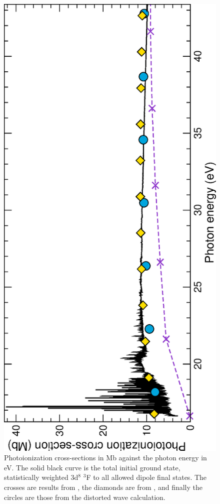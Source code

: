 %
\begin{figure}
\centering
\includegraphics[scale=0.83, angle=-90]{Figures/Cobalt/photo/ground.eps}
\caption{Photoionization cross-sections in Mb against the photon energy in eV. The solid black curve is the total initial ground state, statistically weighted 3d$^8$ $^3$F to all allowed dipole final states. The crosses are results from \citet{1979ApJS...40..815R}, the diamonds are from \citet{1993ADNDT..55..233V}, and finally the circles are those from the distorted wave calculation. \citep{2015JPhB...48n4014F} \label{fig:co_ground}}
\end{figure}
%

